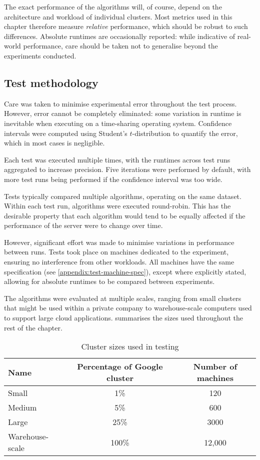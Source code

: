 The exact performance of the algorithms will, of course, depend on the architecture and workload of individual clusters. Most metrics used in this chapter therefore measure \emph{relative} performance, which should be robust to such differences. Absolute runtimes are occasionally reported: while indicative of real-world performance, care should be taken not to generalise beyond the experiments conducted.

\subsection{Test methodology}

Care was taken to minimise experimental error throughout the test process. However, error cannot be completely eliminated: some variation in runtime is inevitable when executing on a time-sharing operating system. Confidence intervals were computed using Student's $t$-distribution to quantify the error, which in most cases is negligible.

Each test was executed multiple times, with the runtimes across test runs aggregated to increase precision. Five iterations were performed by default, with more test runs being performed if the confidence interval was too wide.

Tests typically compared multiple algorithms, operating on the same dataset. Within each test run, algorithms were executed round-robin. This has the desirable property that each algorithm would tend to be equally affected if the performance of the server were to change over time.

However, significant effort was made to minimise variations in performance between runs. Tests took place on machines dedicated to the experiment, ensuring no interference from other workloads. All machines have the same specification (see \cref{appendix:test-machine-spec}), except where explicitly stated, allowing for absolute runtimes to be compared between experiments.

The algorithms were evaluated at multiple scales, ranging from small clusters that might be used within a private company to warehouse-scale computers used to support large cloud applications.  summarises the sizes used throughout the rest of the chapter.

\begin{table}
    \centering
    \begin{tabular}{lcc}
        \textbf{Name} & \textbf{Percentage of Google cluster} & \textbf{Number of machines} \tabularnewline
        \hline
        Small & 1\% & 120 \tabularnewline
        Medium & 5\% & 600 \tabularnewline
        Large & 25\% & 3000 \tabularnewline 
        Warehouse-scale & 100\% & 12,000 \tabularnewline
    \end{tabular}
    \caption{Cluster sizes used in testing}
    \label{table:cluster-sizes}
\end{table}

